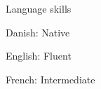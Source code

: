 \documentclass{resume} %
\begin{document}
\begin{rSection}{Language skills}
\item Danish: Native
\item English: Fluent
\item French: Intermediate
\end{rSection}




\end{document}
